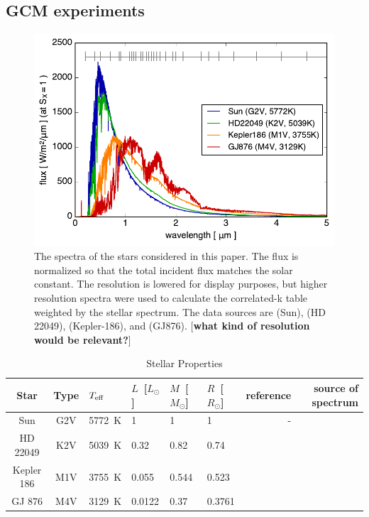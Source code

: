 \documentclass[11pt,numberedappendix,twocolappendix,]{emulateapj}
\def\memo#1{\color{red}$[${\bf #1}$]$ \color{black}}
\begin{document}
\subsection{GCM experiments}

\begin{figure}[!bh]
    \begin{center}
    \includegraphics[width=\hsize]{fig/star_spectra.pdf}
    \end{center}
\caption{The spectra of the stars considered in this paper. The flux is normalized so that the total incident flux matches the solar constant. The resolution is lowered for display purposes, but higher resolution spectra were used to calculate the correlated-k table weighted by the stellar spectrum. The data sources are \citet{Kurucz1995} (Sun), \citet{Segura2003} (HD 22049), \citet{Allard2012} (Kepler-186), and \citet{Domagal-Goldman2014} (GJ876). \memo{what kind of resolution would be relevant?}}
\label{fig:star_spectra}
\end{figure}



\begin{table}[btp]
\caption{Stellar Properties}
\begin{center}
\begin{tabular}{ccllllrr} \hline \hline
%
Star & Type & $T_{\rm eff}$ & $L$~[$L_{\odot}$] & $M$~[$M_{\odot}$] & $R$~[$R_{\odot}$] & reference & source of spectrum \\ \hline
%
Sun & G2V & 5772~K & 1 & 1 & 1 & - & \citet{Kurucz1995} \\ 
%
HD 22049 & K2V & 5039~K & 0.32 & 0.82 & 0.74 & \citet{Baines2012} & \citet{Segura2003} \\
%
Kepler 186 & M1V & 3755~K & 0.055 & 0.544 & 0.523 & \citet{Torres2015} & \citet{Allard2012} \\
%
GJ 876 & M4V & 3129~K & 0.0122 & 0.37 & 0.3761 & \citet{vonBraun2014} & \citet{Domagal-Goldman2014} \\ \hline
\end{tabular}
\end{center}
\label{tbl:stellar_properties}
\end{table}%
\end{document}
